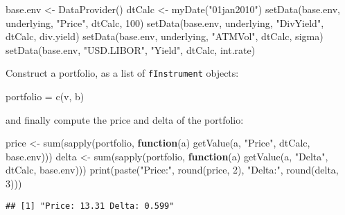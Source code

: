 \documentclass[justified]{tufte-book}
\newenvironment{Shaded}{}{}
\newcommand{\ControlFlowTok}[1]{\textcolor[rgb]{0.00,0.44,0.13}{\textbf{#1}}}
\newcommand{\DecValTok}[1]{\textcolor[rgb]{0.25,0.63,0.44}{#1}}
\newcommand{\FunctionTok}[1]{\textcolor[rgb]{0.02,0.16,0.49}{#1}}
\newcommand{\NormalTok}[1]{#1}
\newcommand{\OtherTok}[1]{\textcolor[rgb]{0.00,0.44,0.13}{#1}}
\newcommand{\StringTok}[1]{\textcolor[rgb]{0.25,0.44,0.63}{#1}}
\newcommand{\class}[1]{\texttt{#1}}
\begin{document}
\begin{Shaded}
\begin{Highlighting}[]
\NormalTok{base.env }\OtherTok{\textless{}{-}} \FunctionTok{DataProvider}\NormalTok{()}
\NormalTok{dtCalc }\OtherTok{\textless{}{-}} \FunctionTok{myDate}\NormalTok{(}\StringTok{"01jan2010"}\NormalTok{)}
\FunctionTok{setData}\NormalTok{(base.env, underlying, }\StringTok{"Price"}\NormalTok{, dtCalc, }\DecValTok{100}\NormalTok{)}
\FunctionTok{setData}\NormalTok{(base.env, underlying, }\StringTok{"DivYield"}\NormalTok{, dtCalc, div.yield)}
\FunctionTok{setData}\NormalTok{(base.env, underlying, }\StringTok{"ATMVol"}\NormalTok{, dtCalc, sigma)}
\FunctionTok{setData}\NormalTok{(base.env, }\StringTok{"USD.LIBOR"}\NormalTok{, }\StringTok{"Yield"}\NormalTok{, dtCalc, int.rate)}
\end{Highlighting}
\end{Shaded}

Construct a portfolio, as a list of \class{fInstrument} objects:

\begin{Shaded}
\begin{Highlighting}[]
\NormalTok{portfolio }\OtherTok{=} \FunctionTok{c}\NormalTok{(v, b)}
\end{Highlighting}
\end{Shaded}

and finally compute the price and delta of the portfolio:

\begin{Shaded}
\begin{Highlighting}[]
\NormalTok{price }\OtherTok{\textless{}{-}} \FunctionTok{sum}\NormalTok{(}\FunctionTok{sapply}\NormalTok{(portfolio, }\ControlFlowTok{function}\NormalTok{(a) }\FunctionTok{getValue}\NormalTok{(a,}
    \StringTok{"Price"}\NormalTok{, dtCalc, base.env)))}
\NormalTok{delta }\OtherTok{\textless{}{-}} \FunctionTok{sum}\NormalTok{(}\FunctionTok{sapply}\NormalTok{(portfolio, }\ControlFlowTok{function}\NormalTok{(a) }\FunctionTok{getValue}\NormalTok{(a,}
    \StringTok{"Delta"}\NormalTok{, dtCalc, base.env)))}
\FunctionTok{print}\NormalTok{(}\FunctionTok{paste}\NormalTok{(}\StringTok{"Price:"}\NormalTok{, }\FunctionTok{round}\NormalTok{(price, }\DecValTok{2}\NormalTok{), }\StringTok{"Delta:"}\NormalTok{, }\FunctionTok{round}\NormalTok{(delta,}
    \DecValTok{3}\NormalTok{)))}
\end{Highlighting}
\end{Shaded}

\begin{verbatim}
## [1] "Price: 13.31 Delta: 0.599"
\end{verbatim}
\end{document}
